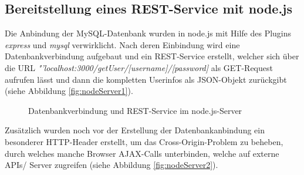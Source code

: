 \subsection{Bereitstellung eines REST-Service mit node.js}
\label{Bereitstellung eines REST-Service mit node.js}
Die Anbindung der MySQL-Datenbank wurden in node.js mit Hilfe des Plugins \textit{express} und \textit{mysql} verwirklicht. Nach deren Einbindung wird eine Datenbankverbindung aufgebaut und ein REST-Service erstellt, welcher sich über die URL \textit{"'localhost:3000/getUser/[username]/[password]} als GET-Request aufrufen lässt und dann die kompletten Userinfos als JSON-Objekt zurückgibt (siehe Abbildung \vref{fig:nodeServer1}).

\begin{figure}[!h]
	\caption{Datenbankverbindung und REST-Service im node.js-Server}
	\label{fig:nodeServer1}
\end{figure}

Zusätzlich wurden noch vor der Erstellung der Datenbankanbindung ein besonderer HTTP-Header erstellt, um das Cross-Origin-Problem zu beheben, durch welches manche Browser AJAX-Calls unterbinden, welche auf externe APIs/ Server zugreifen (siehe Abbildung \vref{fig:nodeServer2}).

